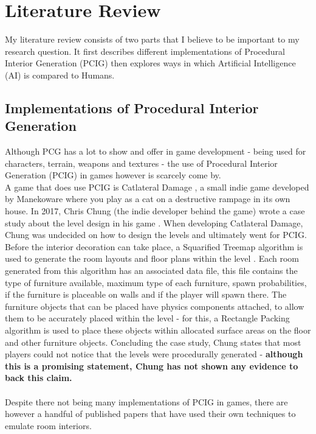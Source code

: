 \section{Literature Review}
My literature review consists of two parts that I believe to be important to my research question. It first describes different implementations of Procedural Interior Generation (PCIG) then explores ways in which Artificial Intelligence (AI) is compared to Humans.

\subsection{Implementations of Procedural Interior Generation}
Although PCG has a lot to show and offer in game development - being used for characters, terrain, weapons and textures - the use of Procedural Interior Generation (PCIG) in games however is scarcely come by.
\\
A game that does use PCIG is Catlateral Damage \cite{game:catlateral},
a small indie game developed by Manekoware where you play as a cat on a destructive rampage 
in its own house. In 2017, Chris Chung (the indie developer behind the game) wrote a case study about the level design in his game \cite{what-is-pcg}. When developing Catlateral Damage, Chung was undecided on how to design the levels and ultimately went for PCIG\cite{pcg_in_gd}. Before the interior decoration can take place, a Squarified Treemap algorithm is used to generate the room layouts and floor plans within the level \cite{squarified-treemap}. Each room generated from this algorithm has an associated data file, this file contains the type of furniture available, maximum type of each furniture, spawn probabilities, if the furniture is placeable on walls and if the player will spawn there. The furniture objects that can be placed have physics components attached, to allow them to be accurately placed within the level - for this, a Rectangle Packing algorithm is used to place these objects within allocated surface areas on the floor and other furniture objects. Concluding the case study, Chung states that most players could not notice that the levels were procedurally generated - \textbf{although this is a promising statement, Chung has not shown any evidence to back this claim.}
\\
\\
Despite there not being many implementations of PCIG in games, there are however a handful of published papers that have used their own techniques to emulate room interiors. \\
